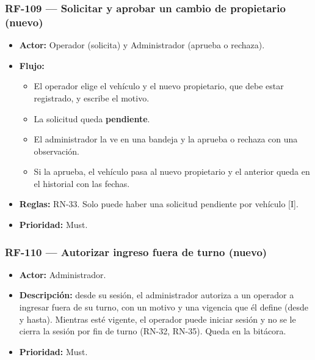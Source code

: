 \subsubsection{RF-109 — Solicitar y aprobar un cambio de propietario (nuevo)}
\begin{itemize}
  \item \textbf{Actor:} Operador (solicita) y Administrador (aprueba o rechaza).
  \item \textbf{Flujo:}
  \begin{itemize}\item El operador elige el vehículo y el nuevo propietario, que debe estar registrado, y escribe el motivo.\end{itemize}
  \begin{itemize}\item La solicitud queda \textbf{pendiente}.\end{itemize}
  \begin{itemize}\item El administrador la ve en una bandeja y la aprueba o rechaza con una observación.\end{itemize}
  \begin{itemize}\item Si la aprueba, el vehículo pasa al nuevo propietario y el anterior queda en el historial con las fechas.\end{itemize}
  \item \textbf{Reglas:} RN-33. Solo puede haber una solicitud pendiente por vehículo [I].
  \item \textbf{Prioridad:} Must.
\end{itemize}

\subsubsection{RF-110 — Autorizar ingreso fuera de turno (nuevo)}
\begin{itemize}
  \item \textbf{Actor:} Administrador.
  \item \textbf{Descripción:} desde su sesión, el administrador autoriza a un operador a ingresar fuera de su turno, con un motivo y una vigencia que él define (desde y hasta). Mientras esté vigente, el operador puede iniciar sesión y no se le cierra la sesión por fin de turno (RN-32, RN-35). Queda en la bitácora.
  \item \textbf{Prioridad:} Must.
\end{itemize}

